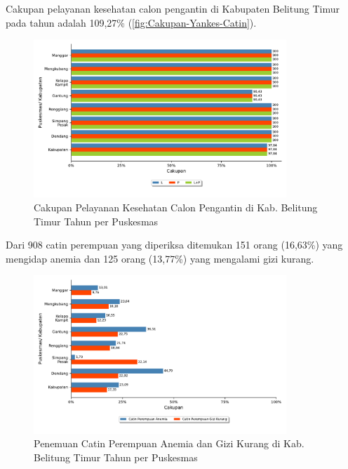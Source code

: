 Cakupan pelayanan kesehatan calon pengantin di Kabupaten Belitung Timur pada tahun \tP adalah 109,27\% (\autoref{fig:Cakupan-Yankes-Catin}).

\begin{figure}[H]
	\centering
	\includegraphics[width=0.85\textwidth]{bab_05/bab_05_29a_pelayananCatin}
	\caption{Cakupan Pelayanan Kesehatan Calon Pengantin di Kab. Belitung Timur Tahun \tP per Puskesmas}
	\label{fig:Cakupan-Yankes-Catin}
\end{figure}

Dari 908 catin perempuan yang diperiksa ditemukan 151 orang (16,63\%) yang mengidap anemia dan 125 orang (13,77\%) yang mengalami gizi kurang.

\begin{figure}[H]
	\centering
	\includegraphics[width=0.85\textwidth]{bab_05/bab_05_29b_catinResiko}
	\caption{Penemuan Catin Perempuan Anemia dan Gizi Kurang di Kab. Belitung Timur Tahun \tP per Puskesmas}
	\label{fig:Cakupan-Yankes-Catin-Anemia}
\end{figure}

